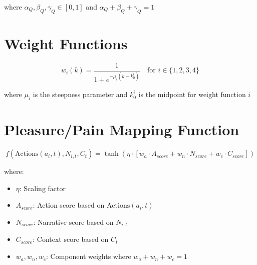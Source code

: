 \documentclass[12pt, a4paper]{article}
\begin{document}
where \( \alpha_Q, \beta_Q, \gamma_Q \in [0,1] \) and \( \alpha_Q + \beta_Q + \gamma_Q = 1 \)

\section{Weight Functions}

\begin{equation}
w_i(k) = \frac{1}{1 + e^{-\mu_i(k-k_0^i)}} \quad \text{for } i \in \{1,2,3,4\}
\end{equation}

where \( \mu_i \) is the steepness parameter and \( k_0^i \) is the midpoint for weight function \( i \)

\section{Pleasure/Pain Mapping Function}

\begin{equation}
f(\text{Actions}(a_i, t), N_{i,t}, C_t) = \tanh(\eta \cdot [w_a \cdot A_{score} + w_n \cdot N_{score} + w_c \cdot C_{score}])
\end{equation}

where:
\begin{itemize}
    \item \( \eta \): Scaling factor
    \item \( A_{score} \): Action score based on \( \text{Actions}(a_i, t) \)
    \item \( N_{score} \): Narrative score based on \( N_{i,t} \)
    \item \( C_{score} \): Context score based on \( C_t \)
    \item \( w_a, w_n, w_c \): Component weights where \( w_a + w_n + w_c = 1 \)
\end{itemize}
\end{document}
